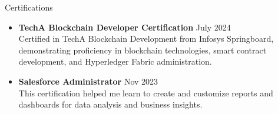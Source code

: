 \documentclass{resume} %
\begin{document}
\begin{rSection}{Certifications} 
        \begin{itemize}
            \item \textbf{TechA Blockchain Developer Certification} \hfill July 2024\\
            Certified in TechA Blockchain Development from Infosys Springboard, demonstrating proficiency in blockchain technologies, smart contract development, and Hyperledger Fabric administration.    
    
            \item \textbf{Salesforce Administrator} \hfill Nov 2023\\
            This certification helped me learn to create and customize reports and dashboards for data analysis and business insights.
    \end{itemize}
        
        
        \end{rSection}
         

\end{document}
